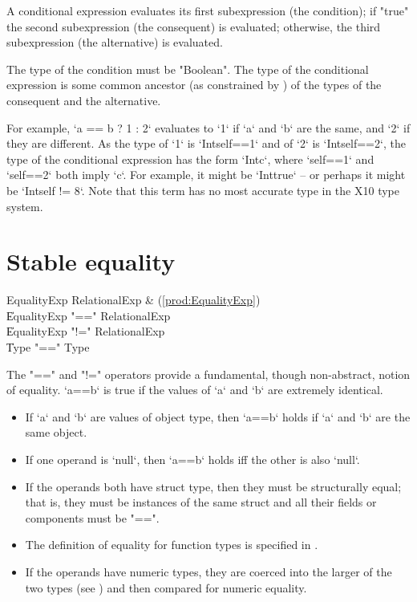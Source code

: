A conditional expression evaluates its first subexpression (the
condition); if \xcd"true"
the second subexpression (the consequent) is evaluated; otherwise,
the third subexpression (the alternative) is evaluated.

The type of the condition must be \xcd"Boolean".
The type of the conditional expression is some common 
ancestor (as constrained by ) of the types of the consequent and the
alternative. 

For example, 
\xcd`a == b ? 1 : 2`
evaluates to \xcd`1` if \xcd`a` and \xcd`b` are the same, and \xcd`2` if they
are different.   As the type of \xcd`1` is \xcd`Int{self==1}` and of \xcd`2`
is \xcd`Int{self==2}`, the type of the conditional expression has the form
\xcd`Int{c}`, where \xcd`self==1` and \xcd`self==2` both imply \xcd`c`.  For
example, it might be \xcd`Int{true}` -- or perhaps it might be 
\xcd`Int{self != 8}`. Note that this term has no most accurate type in the X10
type system.

\section{Stable equality}
\label{StableEquality}
\index{==}\index{!=}

\begin{bbgrammar}
 EqualityExp    \: RelationalExp & (\ref{prod:EqualityExp})\\%
    \| EqualityExp \xcd"==" RelationalExp\\
    \| EqualityExp \xcd"!=" RelationalExp\\
    \| Type  \xcd"==" Type \\
\end{bbgrammar}


The \xcd"==" and \xcd"!=" operators provide a fundamental, though
non-abstract, notion of equality.  \xcd`a==b` is true if the values of \xcd`a`
and \xcd`b` are extremely identical.

\begin{itemize}
\item If \xcd`a` and \xcd`b` are values of object type, then \xcd`a==b` holds
      if \xcd`a` and \xcd`b` are the same object.
\item If one operand is \xcd`null`, then \xcd`a==b` holds iff the other is
      also \xcd`null`.
\item If the operands both have struct type, then they must be structurally equal;
that is, they must be instances of the same struct
and all their fields or components must be \xcd"==". 
\item The definition of equality for function types is specified in
      .
\item If the operands have numeric types, they are coerced into the larger of
      the two types (see ) and then compared for numeric equality.
\end{itemize}

